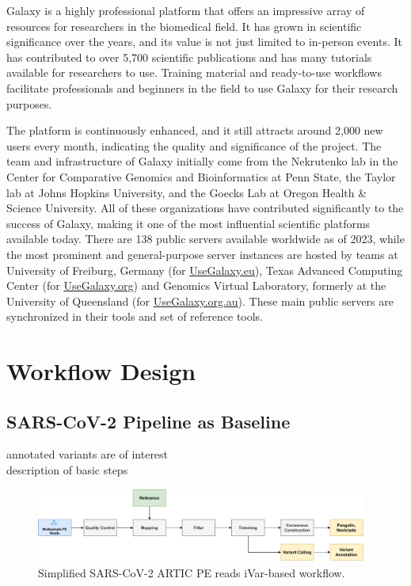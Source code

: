 Galaxy is a highly professional platform that offers an impressive array of resources for researchers in the biomedical field. It has grown in scientific significance over the years, and its value is not just limited to in-person events. It has contributed to over 5,700 scientific publications and has many tutorials available for researchers to use. Training material and ready-to-use workflows facilitate professionals and beginners in the field to use Galaxy for their research purposes.

The platform is continuously enhanced, and it still attracts around 2,000 new users every month, indicating the quality and significance of the project. The team and infrastructure of Galaxy initially come from the Nekrutenko lab in the Center for Comparative Genomics and Bioinformatics at Penn State, the Taylor lab at Johns Hopkins University, and the Goecks Lab at Oregon Health \& Science University. All of these organizations have contributed significantly to the success of Galaxy, making it one of the most influential scientific platforms available today. There are 138 public servers available worldwide as of 2023, while the most prominent and general-purpose server instances are hosted by teams at University of Freiburg, Germany (for \href{https://usegalaxy.eu/}{UseGalaxy.eu}), Texas Advanced Computing Center (for \href{https://usegalaxy.org/}{UseGalaxy.org}) and Genomics Virtual Laboratory, formerly at the University of Queensland (for \href{https://usegalaxy.org.au/}{UseGalaxy.org.au}). These main public servers are synchronized in their tools and set of reference tools. \cite{10.1093/nar/gkac247}


\section{Workflow Design}

\subsection{SARS-CoV-2 Pipeline as Baseline}
annotated variants are of interest \\
description of basic steps

\begin{figure}
	\centering
	\includegraphics[width=0.97\textwidth]{media/workflow-diagrams/pipelines-SARS-CoV-2.pdf}
	\caption{Simplified SARS-CoV-2 ARTIC PE reads iVar-based workflow.}
	\label{fig:wf-sars}
\end{figure}

